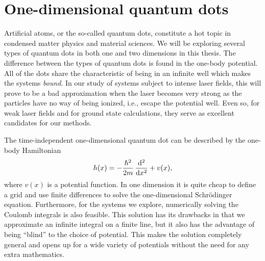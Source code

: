 \section{One-dimensional quantum dots}
    \label{sec:one-dim-ho}
    Artificial atoms, or the so-called quantum dots, constitute a hot topic in
    condensed matter physics and material sciences. We will be exploring
    several types of quantum dots in both one and two dimensions in this
    thesis. The difference between the types of quantum dots is found in the
    one-body potential. All of the dots share the characteristic of being in an
    infinite well which makes the systems \emph{bound}. In our study of systems
    subject to intense laser fields, this will prove to be a bad approximation
    when the laser becomes very strong as the particles have no way of being
    ionized, i.e., escape the potential well.  Even so, for weak laser fields
    and for ground state calculations, they serve as excellent candidates for
    our methods.

    The time-independent one-dimensional quantum dot can be described by the
    one-body Hamiltonian
    \begin{align}
        \oneten(x)
        = -\frac{\hslash^2}{2m} \dod[2]{}{x}
        + v(x),
        \label{eq:one-body-odqd}
    \end{align}
    where $v(x)$ is a potential function.
    In one dimension it is quite cheap to define a grid and use finite
    differences to solve the one-dimensional Schrödinger equation.
    Furthermore, for the systems we explore, numerically solving the Coulomb
    integrals is also feasible.
    This solution has its drawbacks in that we approximate an infinite integral
    on a finite line, but it also has the advantage of being ``blind'' to the
    choice of potential.
    This makes the solution completely general and opens up for a wide variety
    of potentials without the need for any extra mathematics.


